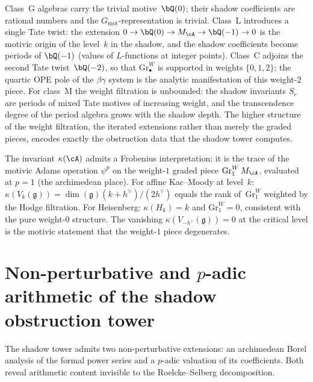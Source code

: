 \begin{remark}
Class~G algebras carry the trivial motive~$\bQ(0)$; their shadow
coefficients are rational numbers and the $G_{\mathrm{mot}}$-representation
is trivial.
Class~L introduces a single Tate twist: the extension
$0 \to \bQ(0) \to M_\cA \to \bQ(-1) \to 0$ is the motivic origin of the
level~$k$ in the shadow, and the shadow coefficients become periods of
$\bQ(-1)$ (values of $L$-functions at integer points).
Class~C adjoins the second Tate twist~$\bQ(-2)$, so that
$\mathrm{Gr}^W_\bullet$ is supported in weights $\{0,1,2\}$; the
quartic OPE pole of the $\beta\gamma$ system is the analytic manifestation
of this weight-$2$ piece.
For class~M the weight filtration is unbounded: the shadow invariants
$S_r$ are periods of mixed Tate motives of increasing weight, and the
transcendence degree of the period algebra grows with the shadow depth.
The higher structure of the weight filtration, the iterated extensions
rather than merely the graded pieces, encodes exactly the obstruction
data that the shadow tower computes.

The invariant $\kappa(\cA)$ admits a Frobenius interpretation:
it is the trace of the motivic Adams operation
$\psi^p$ on the weight-$1$ graded piece
$\mathrm{Gr}^W_1\,M_\cA$,
evaluated at $p = 1$ \textup{(}the archimedean place\textup{)}.
For affine Kac--Moody at level~$k$:
$\kappa(V_k(\mathfrak{g})) =
\dim(\mathfrak{g})(k + h^\vee)/(2h^\vee)$
equals the rank of~$\mathrm{Gr}^W_1$
weighted by the Hodge filtration.
For Heisenberg: $\kappa(H_k) = k$
and $\mathrm{Gr}^W_1 = 0$, consistent with the
pure weight-$0$ structure.
The vanishing $\kappa(V_{-h^\vee}(\mathfrak{g})) = 0$
at the critical level is the motivic statement that
the weight-$1$ piece degenerates.
\end{remark}

\section{Non-perturbative and $p$-adic arithmetic of the shadow obstruction tower}%
\label{sec:nonperturbative-padic}%
%
%

The shadow tower admits two non-perturbative extensions:
an archimedean Borel analysis of the formal power series
and a $p$-adic valuation of its coefficients.
Both reveal arithmetic content invisible to
the Roelcke--Selberg decomposition.

